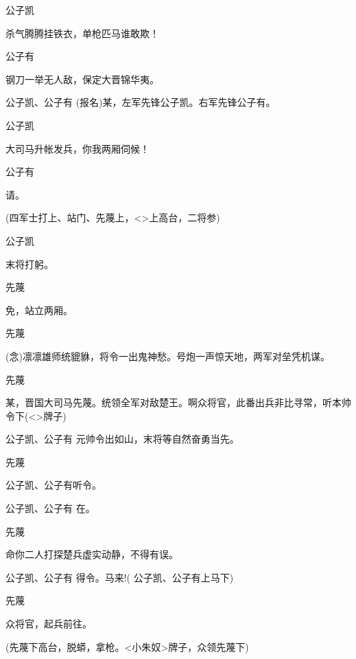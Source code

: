 {公子凯\hspace{20pt}~

杀气腾腾挂铁衣，单枪匹马谁敢欺！

公子有\hspace{20pt}~

钢刀一举无人敌，保定大晋锦华夷。

公子凯、公子有 (报名)某，左军先锋公子凯。右军先锋公子有。

公子凯\hspace{20pt}~

大司马升帐发兵，你我两厢伺候！

公子有\hspace{20pt}~

请。

(四军士打上、站门、先蔑上，\textless{}\!\textgreater{}上高台，二将参)

公子凯\hspace{20pt}~

末将打躬。

先蔑\hspace{30pt}~

免，站立两厢。

先蔑

({\akai 念})凛凛雄师统貔貅，将令一出鬼神愁。号炮一声惊天地，两军对垒凭机谋。

先蔑

某，晋国大司马先蔑。统领全军对敌楚王。啊众将官，此番出兵非比寻常，听本帅令下(\textless{}\!\textgreater{}牌子)

公子凯、公子有 元帅令出如山，末将等自然奋勇当先。

先蔑\hspace{30pt}~

公子凯、公子有听令。

公子凯、公子有 在。

先蔑\hspace{30pt}~

命你二人打探楚兵虚实动静，不得有误。

公子凯、公子有 得令。马来!( 公子凯、公子有上马下)

先蔑\hspace{30pt}~

众将官，起兵前往。

(先蔑下高台，脱蟒，拿枪。\textless{}小朱奴\textgreater{}牌子，众领先蔑下)

\vspace{5pt}

}
